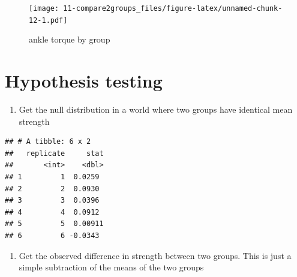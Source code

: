 \documentclass[
]{book}
\newenvironment{Shaded}{\begin{snugshade}}{\end{snugshade}}
\newcommand{\CommentTok}[1]{\textcolor[rgb]{0.56,0.35,0.01}{\textit{#1}}}
\newcommand{\DataTypeTok}[1]{\textcolor[rgb]{0.13,0.29,0.53}{#1}}
\newcommand{\DecValTok}[1]{\textcolor[rgb]{0.00,0.00,0.81}{#1}}
\newcommand{\KeywordTok}[1]{\textcolor[rgb]{0.13,0.29,0.53}{\textbf{#1}}}
\newcommand{\NormalTok}[1]{#1}
\newcommand{\OperatorTok}[1]{\textcolor[rgb]{0.81,0.36,0.00}{\textbf{#1}}}
\newcommand{\StringTok}[1]{\textcolor[rgb]{0.31,0.60,0.02}{#1}}
\providecommand{\tightlist}{%
  \setlength{\itemsep}{0pt}\setlength{\parskip}{0pt}}
\begin{document}
\begin{figure}
\centering
\texttt{[image: 11-compare2groups\_files/figure-latex/unnamed-chunk-12-1.pdf]}
\caption{\label{fig:unnamed-chunk-12}ankle torque by group}
\end{figure}

\hypertarget{hypothesis-testing}{%
\section{Hypothesis testing}\label{hypothesis-testing}}

\begin{enumerate}
\def\labelenumi{\arabic{enumi}.}
\tightlist
\item
  Get the null distribution in a world where two groups have identical mean strength
\end{enumerate}

\begin{Shaded}
\end{Shaded}

\begin{verbatim}
## # A tibble: 6 x 2
##   replicate     stat
##       <int>    <dbl>
## 1         1  0.0259 
## 2         2  0.0930 
## 3         3  0.0396 
## 4         4  0.0912 
## 5         5  0.00911
## 6         6 -0.0343
\end{verbatim}

\begin{enumerate}
\def\labelenumi{\arabic{enumi}.}
\setcounter{enumi}{1}
\tightlist
\item
  Get the observed difference in strength between two groups. This is just a simple subtraction of the means of the two groups
\end{enumerate}
\end{document}
